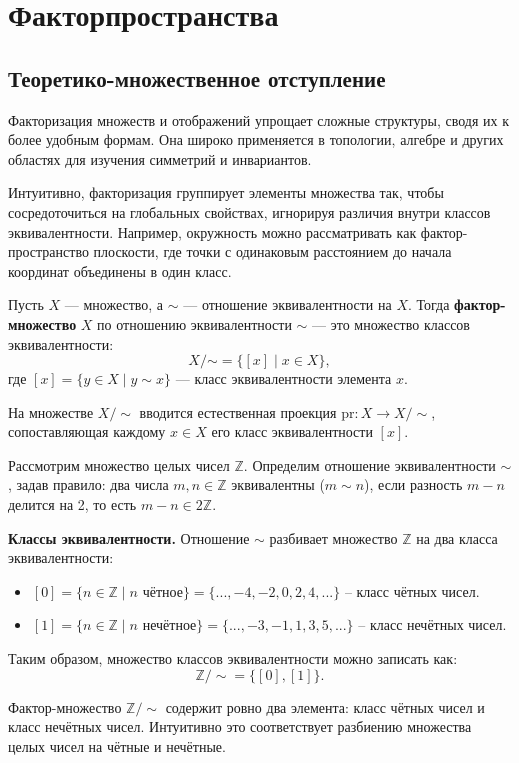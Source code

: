 \section{Факторпространства}

\subsection{Теоретико-множественное отступление}

Факторизация множеств и отображений упрощает сложные структуры, сводя их к более удобным формам. Она широко применяется в топологии, алгебре и других областях для изучения симметрий и инвариантов.

Интуитивно, факторизация группирует элементы множества так, чтобы сосредоточиться на глобальных свойствах, игнорируя различия внутри классов эквивалентности. Например, окружность можно рассматривать как фактор-пространство плоскости, где точки с одинаковым расстоянием до начала координат объединены в один класс.




\begin{definition}
    Пусть \( X \) — множество, а \( \sim \) — отношение эквивалентности на \( X \). Тогда \textbf{фактор-множество} \( X \) по отношению эквивалентности \( \sim \) — это множество классов эквивалентности:
    \[
    X / \mathord{\sim} = \{ [x] \mid x \in X \},
    \]
    где \( [x] = \{ y \in X \mid y \sim x \} \) — класс эквивалентности элемента \( x \). 

    На множестве \( X / \sim \) вводится естественная проекция \( \text{pr}: X \to X / \sim \), сопоставляющая каждому \( x \in X \) его класс эквивалентности \( [x] \).
\end{definition}


\begin{example}
	Рассмотрим множество целых чисел \( \mathbb{Z} \). Определим отношение эквивалентности \( \sim \), задав правило: два числа \( m, n \in \mathbb{Z} \) эквивалентны (\( m \sim n \)), если разность \( m - n \) делится на 2, то есть \( m - n \in 2\mathbb{Z} \).
	
	\textbf{Классы эквивалентности.}  
	Отношение \( \sim \) разбивает множество \( \mathbb{Z} \) на два класса эквивалентности:  
	\begin{itemize}
		\item \( [0] = \{ n \in \mathbb{Z} \mid n \text{ чётное} \} = \{ ..., -4, -2, 0, 2, 4, ... \} \) -- класс чётных чисел.
		\item \( [1] = \{ n \in \mathbb{Z} \mid n \text{ нечётное} \} = \{ ..., -3, -1, 1, 3, 5, ... \} \) -- класс нечётных чисел.
	\end{itemize}
	
	Таким образом, множество классов эквивалентности можно записать как:  
	\[
	\mathbb{Z}/{\sim }= \{ [0], [1] \}.
	\]
	
	Фактор-множество \( \mathbb{Z}/{\sim }\) содержит ровно два элемента: класс чётных чисел и класс нечётных чисел. Интуитивно это соответствует разбиению множества целых чисел на чётные и нечётные.
	\end{example}
	
